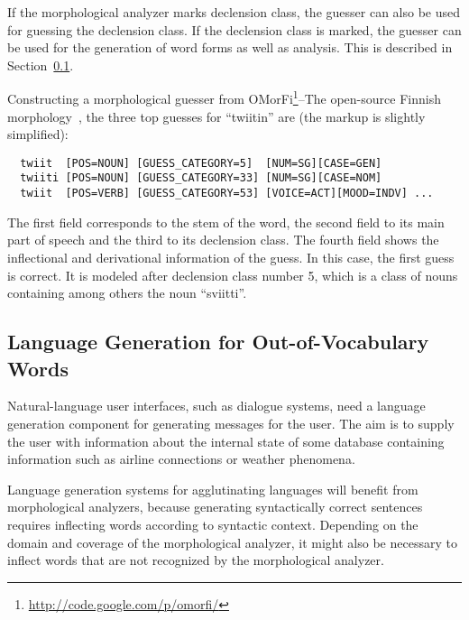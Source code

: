 \documentclass{llncs}
\begin{document}
If the morphological analyzer marks declension class, the guesser can
also be used for guessing the declension class. If the declension
class is marked, the guesser can be used for the generation of word forms
as well as analysis. This is described in Section~\ref{sec:morph-generation}.

\begin{sloppypar}
Constructing a morphological guesser from
OMorFi\footnote{\url{http://code.google.com/p/omorfi/}}--The open-source
Finnish morphology~\cite{pirinen/2008}, the three top guesses for
``twiitin'' are (the markup is slightly simplified): \small
\begin{verbatim}
  twiit  [POS=NOUN] [GUESS_CATEGORY=5]  [NUM=SG][CASE=GEN]
  twiiti [POS=NOUN] [GUESS_CATEGORY=33] [NUM=SG][CASE=NOM]
  twiit  [POS=VERB] [GUESS_CATEGORY=53] [VOICE=ACT][MOOD=INDV] ...
\end{verbatim}
\normalsize
The first field corresponds to the stem of the word, the second field
to its main part of speech and the third to its declension class. The
fourth field shows the inflectional and derivational information of
the guess. In this case, the first guess is correct. It is modeled
after declension class number 5, which is a class of nouns containing
among others the noun ``sviitti''.
\end{sloppypar}

\subsection{Language Generation for Out-of-Vocabulary Words}
\label{sec:morph-generation}
Natural-language user interfaces, such as dialogue systems, need a
language generation component for generating messages for the
user. The aim is to supply the user with information about the
internal state of some database containing information such as airline
connections or weather phenomena.

Language generation systems for agglutinating languages will benefit
from morphological analyzers, because generating syntactically correct
sentences requires inflecting words according to syntactic
context. Depending on the domain and coverage of the morphological
analyzer, it might also be necessary to inflect words that are not
recognized by the morphological analyzer. 
\end{document}
